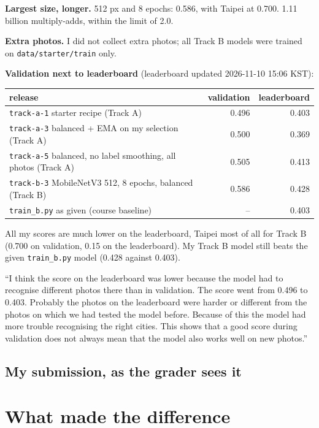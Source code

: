 \documentclass[11pt]{article}
\begin{document}
\textbf{Largest size, longer.} 512 px and 8 epochs: 0.586, with Taipei at
0.700. 1.11 billion multiply-adds, within the limit of 2.0.

\textbf{Extra photos.} I did not collect extra photos; all Track B models were
trained on \texttt{data/starter/train} only.

\textbf{Validation next to leaderboard} (leaderboard updated 2026-11-10
15:06 KST):

\begin{center}\footnotesize
\begin{tabular}{lrr}
\toprule
release & validation & leaderboard \\
\midrule
\texttt{track-a-1} starter recipe (Track A) & 0.496 & 0.403 \\
\texttt{track-a-3} balanced + EMA on my selection (Track A) & 0.500 & 0.369 \\
\texttt{track-a-5} balanced, no label smoothing, all photos (Track A) & 0.505 & 0.413 \\
\texttt{track-b-3} MobileNetV3 512, 8 epochs, balanced (Track B) & 0.586 & 0.428 \\
\texttt{train\_b.py} as given (course baseline) & -- & 0.403 \\
\bottomrule
\end{tabular}
\end{center}

All my scores are much lower on the leaderboard, Taipei most of all for Track
B (0.700 on validation, 0.15 on the leaderboard). My Track B model still beats
the given \texttt{train\_b.py} model (0.428 against 0.403).

``I think the score on the leaderboard was lower because the model had to
recognise different photos there than in validation. The score went from
0.496 to 0.403. Probably the photos on the leaderboard were harder or
different from the photos on which we had tested the model before. Because of
this the model had more trouble recognising the right cities. This shows that
a good score during validation does not always mean that the model also works
well on new photos.''

\subsection*{My submission, as the grader sees it}

\section*{What made the difference}
\end{document}
